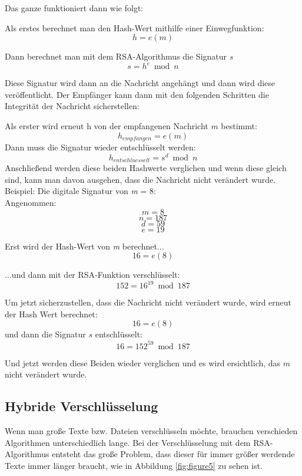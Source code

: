 \documentclass[12pt,a4paper]{scrartcl}
\begin{document}
Das ganze funktioniert dann wie folgt:

Als erstes berechnet man den Hash-Wert mithilfe einer Einwegfunktion:
$$ {h = e(m)} $$

Dann berechnet man mit dem RSA-Algorithmus die Signatur \textit{s}
$$ {s = h^e \bmod n} $$

Diese Signatur wird dann an die Nachricht angehängt und dann wird diese veröffentlicht.
Der Empfänger kann dann mit den folgenden Schritten die Integrität der Nachricht sicherstellen:

Als erster wird erneut h von der empfangenen Nachricht $m$ bestimmt:
$${h_{empfangen} = e(m) }$$
Dann muss die Signatur wieder entschlüsselt werden:
$$ {h_{entschluesselt} = s^d \bmod n} $$
Anschließend werden diese beiden Hashwerte verglichen und wenn diese gleich sind, kann man davon ausgehen, dass die Nachricht nicht verändert wurde. \\


Beispiel: Die digitale Signatur von \textit{m} = 8:\\ 
Angenommen:
$${ \textit{m} = 8 }$$
$${ \textit{n} = 187 }$$
$${ \textit{d} = 59 }$$
$${ \textit{e} = 19 }$$


Erst wird der Hash-Wert von \textit{m} berechnet...
$$ {16 = e(8)} $$	

...und dann mit der RSA-Funktion verschlüsselt: %
$$ {152 = 16^19 \bmod 187} $$	

Um jetzt sicherzustellen, dass die Nachricht nicht verändert wurde, wird erneut der Hash Wert berechnet:
$$ {16 = e(8)} $$	
und dann die Signatur $s$ entschlüsselt:
$$ {16 = 152^59 \bmod 187} $$

Und jetzt werden diese Beiden wieder verglichen und es wird ersichtlich, das $m$ nicht verändert wurde.


	 	
	\subsection{Hybride Verschlüsselung}
		\label{cha:hybrid}
		
		
		Wenn man große Texte bzw. Dateien verschlüsseln möchte, brauchen verschieden Algorithmen unterschiedlich lange. Bei der Verschlüsselung mit dem RSA-Algorithmus entsteht das große Problem, dass dieser für immer größer  werdende Texte immer länger braucht, wie in Abbildung \ref{fig:figure5} zu sehen ist.
\end{document}
